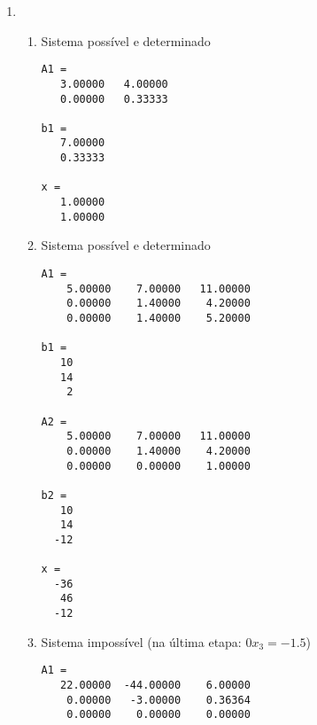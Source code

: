 \documentclass[a4paper]{article}
\begin{document}
\begin{enumerate}
\item %
  \begin{enumerate}
  \item Sistema possível e determinado
    \begin{verbatim}
A1 =
   3.00000   4.00000
   0.00000   0.33333

b1 =
   7.00000
   0.33333

x =
   1.00000
   1.00000
\end{verbatim}
    
  \item Sistema possível e determinado
\begin{verbatim}
A1 =
    5.00000    7.00000   11.00000
    0.00000    1.40000    4.20000
    0.00000    1.40000    5.20000

b1 =
   10
   14
    2

A2 =
    5.00000    7.00000   11.00000
    0.00000    1.40000    4.20000
    0.00000    0.00000    1.00000

b2 =
   10
   14
  -12

x =
  -36
   46
  -12
\end{verbatim}

  \item Sistema impossível (na última etapa: $0x_3 = -1.5$)
\begin{verbatim}
A1 =
   22.00000  -44.00000    6.00000
    0.00000   -3.00000    0.36364
    0.00000    0.00000    0.00000


\end{verbatim}
\end{enumerate}
\end{enumerate}
\end{document}

